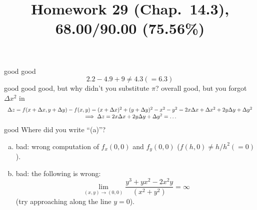 \documentclass[pstricks,10pt,dvipsnames]{article} %
\title{Homework 29 (Chap.~14.3),
68.00/90.00 (75.56\%)
}
\begin{document}
\maketitle
{}
good
good
\begin{equation*}
	2.2-4.9+9\neq4.3\left( =6.3 \right)
\end{equation*}
good
good
good, but why didn't you substitute $\pi$?
overall good, but you forgot $\Delta x^2$ in
\begin{equation*}
	\begin{array}[]{c}
		\Delta z=f(x+\Delta x,y+\Delta y)-f(x,y)=(x+\Delta x)^2+(y+\Delta y)^2-x^2-y^2=2x\Delta x+\Delta x^2+
		2y\Delta y+\Delta y^2\\\implies
		\Delta z=2x\Delta x+2y\Delta y+\Delta y^2=\dots
	\end{array}
\end{equation*}
good
Where did you write ``(a)''?
\begin{enumerate}[(a)]
	\item bad: wrong computation of $f_x(0,0)$ and $f_y(0,0)$ ($f(h,0)\neq h/h^2(=0)$).
	\item bad: the following is wrong:
		\begin{equation*}
			\lim_{(x,y)\to(0,0)}\frac{y^3+yx^2-2x^2y}{(x^2+y^2)}=\infty
		\end{equation*}
		(try approaching along the line $y=0$).
\end{enumerate}
\end{document}
